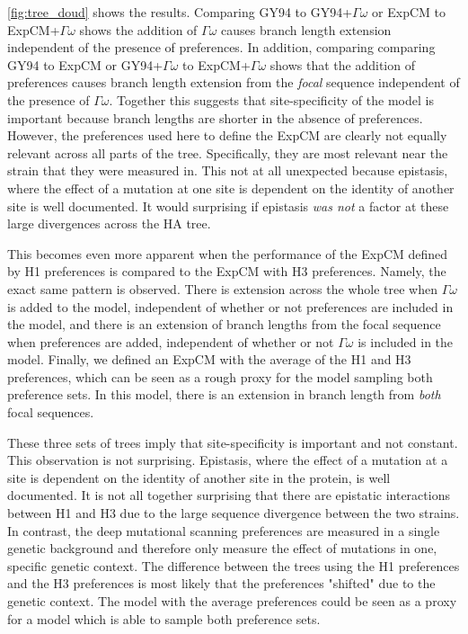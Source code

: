 \documentclass[11pt]{article}
\begin{document}
\ref{fig:tree_doud} shows the results. 
Comparing GY94 to GY94+$\Gamma\omega$ or ExpCM to ExpCM+$\Gamma\omega$ shows the addition of $\Gamma\omega$ causes branch length extension independent of the presence of preferences. 
In addition, comparing comparing GY94 to ExpCM or GY94+$\Gamma\omega$ to ExpCM+$\Gamma\omega$ shows that the addition of preferences causes branch length extension from the \textit{focal} sequence independent of the presence of $\Gamma\omega$. 
Together this suggests that site-specificity of the model is important because branch lengths are shorter in the absence of preferences. 
However, the preferences used here to define the ExpCM are clearly not equally relevant across all parts of the tree. 
Specifically, they are most relevant near the strain that they were measured in. 
This not at all unexpected because epistasis, where the effect of a mutation at one site is dependent on the identity of another site is well documented. 
It would surprising if epistasis \textit{was not} a factor at these large divergences across the HA tree. 

This becomes even more apparent when the performance of the ExpCM defined by H1 preferences is compared to the ExpCM with H3 preferences. 
Namely, the exact same pattern is observed. 
There is extension across the whole tree when $\Gamma\omega$ is added to the model, independent of whether or not preferences are included in the model, and there is an extension of branch lengths from the focal sequence when preferences are added, independent of whether or not $\Gamma\omega$ is included in the model. 
Finally, we defined an ExpCM with the average of the H1 and H3 preferences, which can be seen as a rough proxy for the model sampling both preference sets. 
In this model, there is an extension in branch length from \textit{both} focal sequences. 

These three sets of trees imply that site-specificity is important and not constant. 
This observation is not surprising. 
Epistasis, where the effect of a mutation at a site is dependent on the identity of another site in the protein, is well documented. 
It is not all together surprising that there are epistatic interactions between H1 and H3 due to the large sequence divergence between the two strains. 
In contrast, the deep mutational scanning preferences are measured in a single genetic background and therefore only measure the effect of mutations in one, specific genetic context.  
The difference between the trees using the H1 preferences and the H3 preferences is most likely that the preferences "shifted" due to the genetic context. 
The model with the average preferences could be seen as a proxy for a model which is able to sample both preference sets. 
\end{document}

